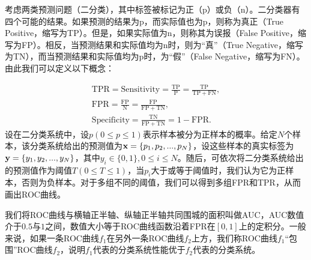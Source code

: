 考虑两类预测问题（二分类），其中标签被标记为正（p）或负（n）。二分类器有四个可能的结果。如果预测的结果为p，而实际值也为p，则称为真正（True Positive，缩写为TP）。但是，如果实际值为n，则称其为误报（False Positive，缩写为FP）。相反，当预测结果和实际值均为n时，则为“真”（True Negative，缩写为TN），而当预测结果和实际值均为p时，为“假”（False Negative，缩写为FN）。由此我们可以定义以下概念：



\begin{gather}
	\mathrm{TPR}=\mathrm{Sensitivity}=\frac{\mathrm{TP}}{\mathrm{P}}=\frac{\mathrm{TP}}{\mathrm{TP}+\mathrm{FN}},\\
	\mathrm{FPR}=\frac{\mathrm{FP}}{\mathrm{N}}=\frac{\mathrm{FP}}{\mathrm{FP}+\mathrm{TN}},\\
	\mathrm{Specificity}=\frac{\mathrm{TN}}{\mathrm{FP}+\mathrm{TN}}=1-\mathrm{FPR}.
\end{gather}
设在二分类系统中，设$p(0\leq p \leq 1)$表示样本被分为正样本的概率。给定$N$个样本，该分类系统给出的预测值为$\mathbf{x}=\{p_1,p_2,...,p_N
\}$，设这些样本的真实标签为$\mathbf{y}=\{y_1,y_2,...,y_N\}$，其中$y_i \in \{0,1\},0\leq i \le N$。随后，可依次将二分类系统给出的预测值作为阈值$T(0\leq T \leq 1)$，当$p_i$大于或等于阈值时，我们认为它为正样本，否则为负样本。对于多组不同的阈值，我们可以得到多组FPR和TPR，从而画出ROC曲线。

我们将ROC曲线与横轴正半轴、纵轴正半轴共同围城的面积叫做AUC，AUC数值介于$0.5$与$1$之间，数值大小等于ROC曲线函数沿着FPR在$[0,1]$上的定积分。一般来说，如果一条ROC曲线$f_1$在另外一条ROC曲线$f_2$上方，我们称ROC曲线$f_1$“包围”ROC曲线$f_2$，说明$f_1$代表的分类系统性能优于$f_2$代表的分类系统。
